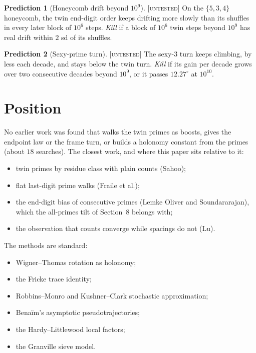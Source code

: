 \documentclass[11pt]{article}
\theoremstyle{definition}
\newtheorem{prediction}{Prediction}
\theoremstyle{remark}
\newcommand{\grade}[1]{\textsc{[#1]}}
\begin{document}
\begin{prediction}[Honeycomb drift beyond $10^9$] \grade{untested}
On the $\{5,3,4\}$ honeycomb, the twin end-digit order keeps drifting more slowly than its shuffles in every later block of $10^6$ steps.
\emph{Kill} if a block of $10^6$ twin steps beyond $10^9$ has real drift within $2$ sd of its shuffles.
\end{prediction}

\begin{prediction}[Sexy-prime turn] \grade{untested}
The sexy-3 turn keeps climbing, by less each decade, and stays below the twin turn.
\emph{Kill} if its gain per decade grows over two consecutive decades beyond $10^9$, or it passes $12.27^\circ$ at $10^{10}$.
\end{prediction}

\section{Position}

No earlier work was found that walks the twin primes as boosts, gives the endpoint law or the frame turn, or builds a holonomy constant from the primes (about $18$ searches). The closest work, and where this paper sits relative to it:
\begin{itemize}
\item twin primes by residue class with plain counts (Sahoo);
\item flat last-digit prime walks (Fraile et al.);
\item the end-digit bias of consecutive primes (Lemke Oliver and Soundararajan), which the all-primes tilt of Section~8 belongs with;
\item the observation that counts converge while spacings do not (Lu).
\end{itemize}
The methods are standard:
\begin{itemize}
\item Wigner--Thomas rotation as holonomy;
\item the Fricke trace identity;
\item Robbins--Monro and Kushner--Clark stochastic approximation;
\item Bena\"im's asymptotic pseudotrajectories;
\item the Hardy--Littlewood local factors;
\item the Granville sieve model.
\end{itemize}
\end{document}
